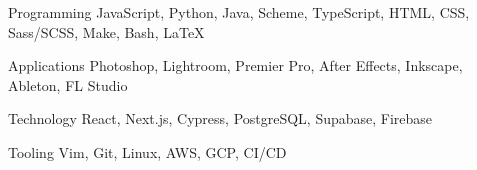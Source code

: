

\begin{cvskills}

  \cvskill
    {Programming} %
    {JavaScript, Python, Java, Scheme, TypeScript, HTML, CSS, Sass/SCSS, Make, Bash, \LaTeX} %

  \cvskill
    {Applications} %
    {Photoshop, Lightroom, Premier Pro, After Effects, Inkscape, Ableton, FL Studio} %

  \cvskill
    {Technology} %
    {React, Next.js, Cypress, PostgreSQL, Supabase, Firebase} %

  \cvskill
    {Tooling} %
    {Vim, Git, Linux, AWS, GCP, CI/CD} %

\end{cvskills}
